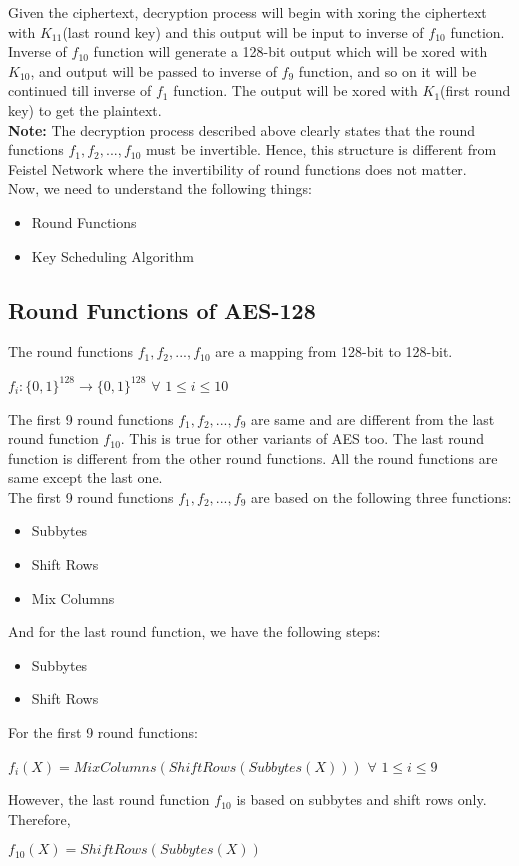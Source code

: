 \documentclass[11pt]{article}
\begin{document}
\vspace{3mm}
Given the ciphertext, decryption process will begin with xoring the ciphertext with $K_{11}$(last round key) and this output will be input to inverse of $f_{10}$ function. Inverse of $f_{10}$ function will generate a 128-bit output which will be xored with $K_{10}$, and output will be passed to inverse of $f_9$ function, and so on it will be continued till inverse of $f_1$ function. The output will be xored with $K_1$(first round key) to get the plaintext.\\
\newline
\textbf{Note:} The decryption process described above clearly states that the round functions $f_1, f_2,..., f_{10}$ must be invertible. Hence, this structure is different from Feistel Network where the invertibility of round functions does not matter. \\
Now, we need to understand the following things:
\begin{itemize}
    \item Round Functions
    \item Key Scheduling Algorithm
\end{itemize}

\subsection{Round Functions of AES-128}
The round functions $f_1, f_2,..., f_{10}$ are a mapping from 128-bit to 128-bit.
\begin{center}
    $f_i : \{0, 1\}^{128} \rightarrow \{0, 1\}^{128}$ $\forall$ $ 1 \leq i \leq 10$
\end{center}
The first 9 round functions $f_1, f_2,..., f_9$ are same and are different from the last round function $f_{10}$. This is true for other variants of AES too. The last round function is different from the other round functions. All the round functions are same except the last one.\\
\newline
The first 9 round functions $f_1, f_2,..., f_9$ are based on the following three functions:
\begin{itemize}
    \item Subbytes
    \item Shift Rows
    \item Mix Columns
\end{itemize}
And for the last round function, we have the following steps:
\begin{itemize}
    \item Subbytes
    \item Shift Rows
\end{itemize}
For the first 9 round functions:
\begin{center}
    $f_i(X) = MixColumns(ShiftRows(Subbytes(X)))$ $\forall$ $1 \leq i \leq 9$
\end{center}
However, the last round function $f_{10}$ is based on subbytes and shift rows only. Therefore,
\begin{center}
    $f_{10}(X) = ShiftRows(Subbytes(X))$
\end{center}
\end{document}
